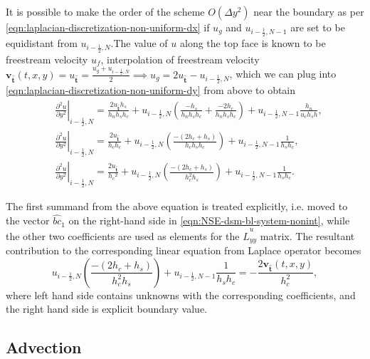 \documentclass{article}
\numberwithin{equation}{section}
\begin{document}
It is possible to make the order of the scheme $O(\Delta y^2)$ near the boundary as per \cref{eqn:laplacian-discretization-non-uniform-dx} if $u_g$ and $u_{i-\frac{1}{2},N-1}$ are set to be equidistant from $u_{i-\frac{1}{2},N}$.The value of $u$ along the top face is known to be freestream velocity $u_{{f}}$, interpolation of freestream velocity $\boldsymbol{v}_\mathbf{\hat{t}}(t,x,y)=u_{\hat{\mathbf{t}}} = \frac{u_g+u_{i-\frac{1}{2},N}}{2}\implies u_g=2u_{\hat{\mathbf{t}}}-u_{i-\frac{1}{2},N}$, which we can plug into \cref{eqn:laplacian-discretization-non-uniform-dy} from above to obtain
\begin{equation}
\begin{aligned}
& \left.\frac{\partial ^2 u}{\partial y^2}\right|_{i-\frac{1}{2},N}=\frac{2 u_{\hat{\mathbf{t}}} h_s}{h_n h_s h_c}+u_{i-\frac{1}{2},N}\left(\frac{-h_s}{h_n h_s h_c}+\frac{-2 h_c}{h_n h_s h_c}\right)+u_{i-\frac{1}{2},N-1} \frac{h_n}{u_c h_s h},\\
& \left.\frac{\partial^2 u}{\partial y^2}\right|_{i-\frac{1}{2},N}=\frac{2 u_{\hat{\mathbf{t}}}}{h_c h_c}+u_{i-\frac{1}{2},N}\left(\frac{-\left(2 h_c+h_s\right)}{h_c h_s h_c}\right)+u_{i-\frac{1}{2},N-1} \frac{1}{h_s h_c}, \\
& \left.\frac{\partial^2 u}{\partial y^2}\right|_{i-\frac{1}{2},N}=\frac{2 u_{\hat{\mathbf{t}}}}{h_c{ }^2}+u_{i-\frac{1}{2},N}\left(\frac{-\left(2 h_c+h_s\right)}{h_c^2 h_s}\right)+u_{i-\frac{1}{2},N-1} \frac{1}{h_s h_c}.
\end{aligned}
\end{equation}

The first summand from the above equation is treated explicitly, i.e. moved to the vector $\hat{bc}_1$ on the right-hand side in \cref{eqn:NSE-dsm-bl-system-nonint}, while the other two coefficients are used as elements for the $\hat{L}^u_{yy}$ matrix. The resultant contribution to the corresponding linear equation from Laplace operator becomes
\begin{equation}
	u_{i-\frac{1}{2},N}\left(\frac{-\left(2 h_c+h_s\right)}{h_c^2 h_s}\right)+u_{i-\frac{1}{2},N-1} \frac{1}{h_s h_c}=-\frac{2 \boldsymbol{v}_\mathbf{\hat{t}}(t,x,y)}{h_c^2},
\end{equation}
where left hand side contains unknowns with the corresponding coefficients, and the right hand side is explicit boundary value.


\subsection{Advection}\label{subsec:advection}
\end{document}
